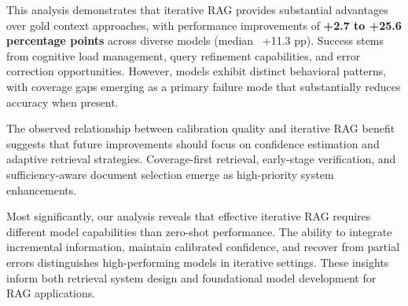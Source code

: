 This analysis demonstrates that iterative RAG provides substantial advantages over gold context approaches, with performance improvements of \textbf{+2.7 to +25.6 percentage points} across diverse models (median ~+11.3 pp). Success stems from cognitive load management, query refinement capabilities, and error correction opportunities. However, models exhibit distinct behavioral patterns, with coverage gaps emerging as a primary failure mode that substantially reduces accuracy when present.

The observed relationship between calibration quality and iterative RAG benefit suggests that future improvements should focus on confidence estimation and adaptive retrieval strategies. Coverage-first retrieval, early-stage verification, and sufficiency-aware document selection emerge as high-priority system enhancements.

Most significantly, our analysis reveals that effective iterative RAG requires different model capabilities than zero-shot performance. The ability to integrate incremental information, maintain calibrated confidence, and recover from partial errors distinguishes high-performing models in iterative settings. These insights inform both retrieval system design and foundational model development for RAG applications.
